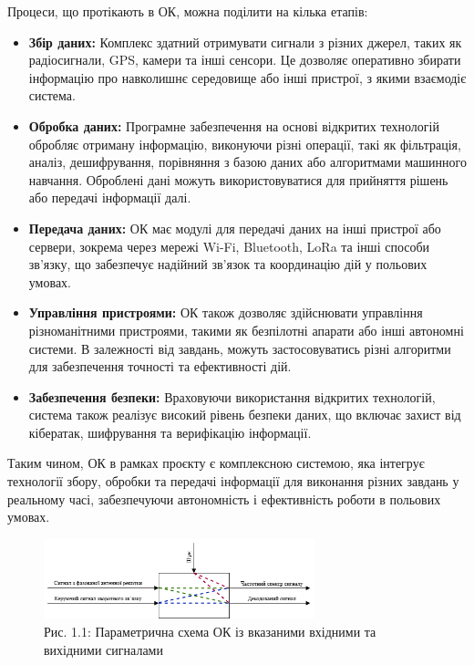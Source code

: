 \documentclass[a4paper]{article}
\begin{document}
Процеси, що протікають в ОК, можна поділити на кілька етапів:

\begin{itemize}
    \item \textbf{Збір даних:} Комплекс здатний отримувати сигнали з різних джерел, таких як радіосигнали, GPS, камери та інші сенсори. Це дозволяє оперативно збирати інформацію про навколишнє середовище або інші пристрої, з якими взаємодіє система.
    \item \textbf{Обробка даних:} Програмне забезпечення на основі відкритих технологій обробляє отриману інформацію, виконуючи різні операції, такі як фільтрація, аналіз, дешифрування, порівняння з базою даних або алгоритмами машинного навчання. Оброблені дані можуть використовуватися для прийняття рішень або передачі інформації далі.
    \item \textbf{Передача даних:} ОК має модулі для передачі даних на інші пристрої або сервери, зокрема через мережі Wi-Fi, Bluetooth, LoRa та інші способи зв'язку, що забезпечує надійний зв'язок та координацію дій у польових умовах.
    \item \textbf{Управління пристроями:} ОК також дозволяє здійснювати управління різноманітними пристроями, такими як безпілотні апарати або інші автономні системи. В залежності від завдань, можуть застосовуватись різні алгоритми для забезпечення точності та ефективності дій.
    \item \textbf{Забезпечення безпеки:} Враховуючи використання відкритих технологій, система також реалізує високий рівень безпеки даних, що включає захист від кібератак, шифрування та верифікацію інформації.
\end{itemize}

Таким чином, ОК в рамках проєкту є комплексною системою, яка інтегрує технології збору, обробки та передачі інформації для виконання різних завдань у реальному часі, забезпечуючи автономність і ефективність роботи в польових умовах.

\begin{figure}[h]
    \centering
    \includegraphics[width=0.7\textwidth]{imgs/PW1.1.png}
    \caption*{Рис. 1.1: Параметрична схема ОК із вказаними вхідними та вихідними сигналами}
\end{figure} 
\end{document}
